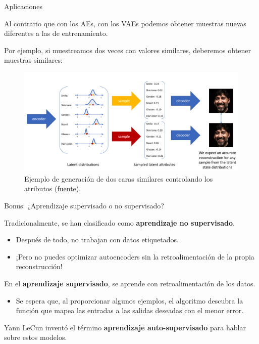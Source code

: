 \fi

\begin{frame}{Aplicaciones}

Al contrario que con los AEs, con los VAEs podemos obtener muestras nuevas diferentes a las de entrenamiento.

Por ejemplo, si muestreamos dos veces con valores similares, deberemos obtener muestras similares:

\begin{figure}
    \centering
    \includegraphics[width=.7\textwidth]{Slides/figures/02_Metodos_Generativos/vae-face-generator-smile_pds-example.png}
    \caption{Ejemplo de generación de dos caras similares controlando los atributos (\href{https://www.jeremyjordan.me/variational-autoencoders/}{fuente}).}
    \label{fig:enter-label}
\end{figure}
    
\end{frame}


\begin{frame}{Bonus: ¿Aprendizaje supervisado o no supervisado?}

Tradicionalmente, se han clasificado como \textbf{aprendizaje no supervisado}.

\begin{itemize}
    \item Después de todo, no trabajan con datos etiquetados.
    \item ¡Pero no puedes optimizar autoencoders sin la retroalimentación de la propia reconstrucción!
\end{itemize}

En el \textbf{aprendizaje supervisado}, se aprende con retroalimentación de los datos.

\begin{itemize}
    \item Se espera que, al proporcionar algunos ejemplos, el algoritmo descubra la función que mapea las entradas a las salidas deseadas con el menor error.
\end{itemize}

Yann LeCun inventó el término \textbf{aprendizaje auto-supervisado} para hablar sobre estos modelos.
\end{frame}

